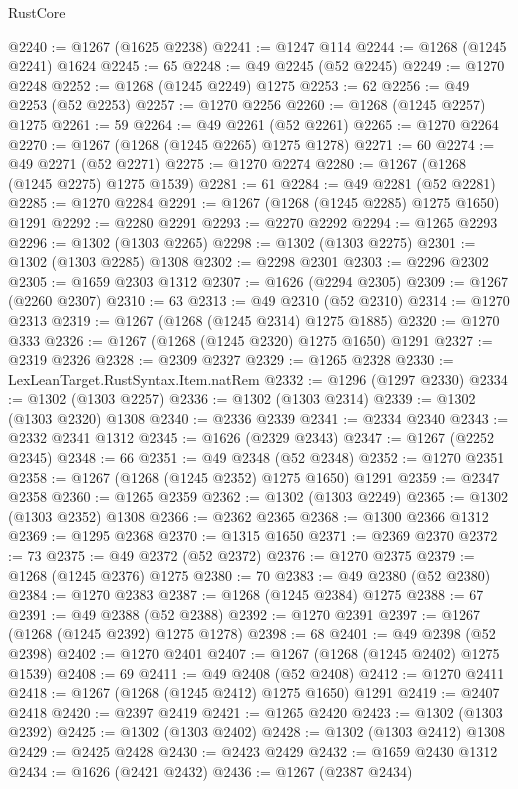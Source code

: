 \begin{lexlean}{RustCore}
\begin{coremodule}
@2240 := @1267 (@1625 @2238)
@2241 := @1247 @114
@2244 := @1268 (@1245 @2241) @1624
@2245 := 65
@2248 := @49 @2245 (@52 @2245)
@2249 := @1270 @2248
@2252 := @1268 (@1245 @2249) @1275
@2253 := 62
@2256 := @49 @2253 (@52 @2253)
@2257 := @1270 @2256
@2260 := @1268 (@1245 @2257) @1275
@2261 := 59
@2264 := @49 @2261 (@52 @2261)
@2265 := @1270 @2264
@2270 := @1267 (@1268 (@1245 @2265) @1275 @1278)
@2271 := 60
@2274 := @49 @2271 (@52 @2271)
@2275 := @1270 @2274
@2280 := @1267 (@1268 (@1245 @2275) @1275 @1539)
@2281 := 61
@2284 := @49 @2281 (@52 @2281)
@2285 := @1270 @2284
@2291 := @1267 (@1268 (@1245 @2285) @1275 @1650) @1291
@2292 := @2280 @2291
@2293 := @2270 @2292
@2294 := @1265 @2293
@2296 := @1302 (@1303 @2265)
@2298 := @1302 (@1303 @2275)
@2301 := @1302 (@1303 @2285) @1308
@2302 := @2298 @2301
@2303 := @2296 @2302
@2305 := @1659 @2303 @1312
@2307 := @1626 (@2294 @2305)
@2309 := @1267 (@2260 @2307)
@2310 := 63
@2313 := @49 @2310 (@52 @2310)
@2314 := @1270 @2313
@2319 := @1267 (@1268 (@1245 @2314) @1275 @1885)
@2320 := @1270 @333
@2326 := @1267 (@1268 (@1245 @2320) @1275 @1650) @1291
@2327 := @2319 @2326
@2328 := @2309 @2327
@2329 := @1265 @2328
@2330 := LexLeanTarget.RustSyntax.Item.natRem
@2332 := @1296 (@1297 @2330)
@2334 := @1302 (@1303 @2257)
@2336 := @1302 (@1303 @2314)
@2339 := @1302 (@1303 @2320) @1308
@2340 := @2336 @2339
@2341 := @2334 @2340
@2343 := @2332 @2341 @1312
@2345 := @1626 (@2329 @2343)
@2347 := @1267 (@2252 @2345)
@2348 := 66
@2351 := @49 @2348 (@52 @2348)
@2352 := @1270 @2351
@2358 := @1267 (@1268 (@1245 @2352) @1275 @1650) @1291
@2359 := @2347 @2358
@2360 := @1265 @2359
@2362 := @1302 (@1303 @2249)
@2365 := @1302 (@1303 @2352) @1308
@2366 := @2362 @2365
@2368 := @1300 @2366 @1312
@2369 := @1295 @2368
@2370 := @1315 @1650
@2371 := @2369 @2370
@2372 := 73
@2375 := @49 @2372 (@52 @2372)
@2376 := @1270 @2375
@2379 := @1268 (@1245 @2376) @1275
@2380 := 70
@2383 := @49 @2380 (@52 @2380)
@2384 := @1270 @2383
@2387 := @1268 (@1245 @2384) @1275
@2388 := 67
@2391 := @49 @2388 (@52 @2388)
@2392 := @1270 @2391
@2397 := @1267 (@1268 (@1245 @2392) @1275 @1278)
@2398 := 68
@2401 := @49 @2398 (@52 @2398)
@2402 := @1270 @2401
@2407 := @1267 (@1268 (@1245 @2402) @1275 @1539)
@2408 := 69
@2411 := @49 @2408 (@52 @2408)
@2412 := @1270 @2411
@2418 := @1267 (@1268 (@1245 @2412) @1275 @1650) @1291
@2419 := @2407 @2418
@2420 := @2397 @2419
@2421 := @1265 @2420
@2423 := @1302 (@1303 @2392)
@2425 := @1302 (@1303 @2402)
@2428 := @1302 (@1303 @2412) @1308
@2429 := @2425 @2428
@2430 := @2423 @2429
@2432 := @1659 @2430 @1312
@2434 := @1626 (@2421 @2432)
@2436 := @1267 (@2387 @2434)

\end{coremodule}
\end{lexlean}
